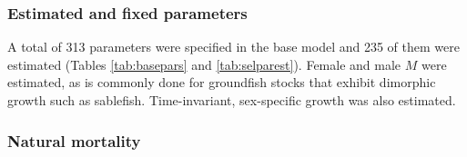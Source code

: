 \documentclass[11pt,
  english,
  a4paper,
]{article}
\begin{document}
\leavevmode\tagmcend\tagstructend\par

\hypertarget{estimated-and-fixed-parameters}{%
\subsubsection{Estimated and fixed parameters}\label{estimated-and-fixed-parameters}}

\leavevmode\tagmcend\tagstructend


A total of 313 parameters were specified in the base model and 235 of them were estimated (Tables \ref{tab:basepars} and \ref{tab:selparest}). Female and male {\(M\)\leavevmode\tagmcend\tagstructend} were estimated, as is commonly done for groundfish stocks that exhibit dimorphic growth such as sablefish. Time-invariant, sex-specific growth was also estimated.

\leavevmode\tagmcend\tagstructend\par


\hypertarget{natural-mortality}{%
\subsubsection{Natural mortality}\label{natural-mortality}}

\leavevmode\tagmcend\tagstructend
\end{document}
